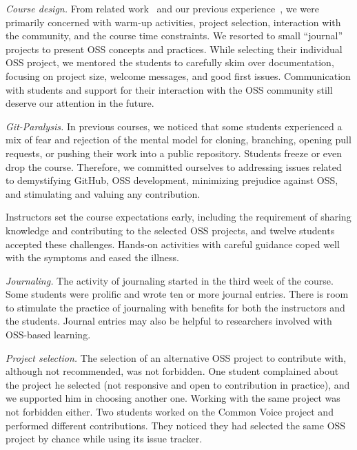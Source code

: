 \documentclass[sigconf]{acmart}
\begin{document}
\begin{description}
\item \textit{Course design.} 
From related work~\cite{pinto:cseet:2017,DBLP:conf/sbes/FerreiraS0SM18,DBLP:conf/icse/0001FSSM19} and our previous experience~\cite{2015:CSE:nascimento,nascimento:fie:2018,nascimento:oss:2019},
we were primarily concerned with warm-up activities, project selection, interaction with the community, and the course time constraints.
%
We resorted to small ``journal'' projects to present OSS concepts and practices. While selecting their individual OSS project, we mentored the students to carefully skim over documentation, focusing on project size, welcome messages, and good first issues. 
Communication with students and support for their interaction with the OSS community still deserve our attention in the future. 

\item \textit{Git-Paralysis.} 
In previous courses, we noticed that some students experienced a mix of fear and rejection of the mental model for cloning, branching, opening pull requests, or pushing their work into a public repository. 
Students freeze or even drop the course. 
Therefore, we committed ourselves to addressing issues related to demystifying GitHub, OSS development, minimizing prejudice against OSS, and stimulating and valuing any contribution.

Instructors set the course expectations early, including the requirement of sharing knowledge and contributing to the selected OSS projects, and twelve students accepted these challenges.
Hands-on activities with careful guidance coped well with the symptoms and eased the illness.

\item \textit{Journaling.}
The activity of journaling started in the third week of the course. 
Some students were prolific and wrote ten or more journal entries. 
There is room to stimulate the practice of journaling with benefits for both the instructors and the students. Journal entries may also be helpful to researchers involved with OSS-based learning.

\item \textit{Project selection.} 
The selection of an alternative OSS project to contribute with, although not recommended, was not forbidden. 
One student complained about the project he selected (not responsive and open to contribution in practice), and we supported him in choosing another one.
Working with the same project was not forbidden either.
Two students worked on the Common Voice project and performed different contributions. They noticed they had selected the same OSS project by chance while using its issue tracker. 


\end{description}
\end{document}
